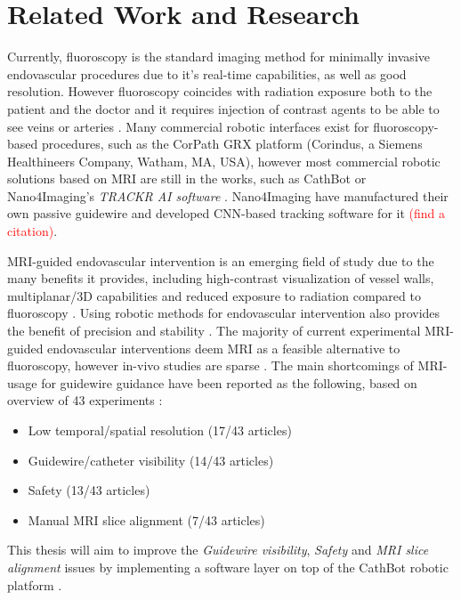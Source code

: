 \documentclass{article}
\begin{document}
\section{Related Work and Research}
Currently, fluoroscopy is the standard imaging method for minimally invasive endovascular procedures due to it's real-time capabilities, as well as good resolution. However fluoroscopy coincides with radiation exposure both to the patient and the doctor and it requires injection of contrast agents to be able to see veins or arteries \cite{pmid35420239}. Many commercial robotic interfaces exist for fluoroscopy-based procedures, such as the CorPath GRX platform (Corindus, a Siemens Healthineers Company, Watham, MA, USA), however most commercial robotic solutions based on MRI are still in the works, such as CathBot \cite{cathbot} or Nano4Imaging's \textit{TRACKR AI software} \cite{nano4imaging}. Nano4Imaging have manufactured their own passive guidewire and developed CNN-based tracking software for it \textcolor{red}{(find a citation)}.

MRI-guided endovascular intervention is an emerging field of study due to the many benefits it provides, including high-contrast visualization of vessel walls, multiplanar/3D capabilities and reduced exposure to radiation compared to fluoroscopy \cite{active-vs-passive-tracking}. Using robotic methods for endovascular intervention also provides the benefit of precision and stability \cite{pmid24663088}. The majority of current experimental MRI-guided endovascular interventions deem MRI as a feasible alternative to fluoroscopy, however in-vivo studies are sparse \cite{pmid35420239}. The main shortcomings of MRI-usage for guidewire guidance have been reported as the following, based on overview of 43 experiments \cite{pmid35420239}:

\begin{itemize}
    \item Low temporal/spatial resolution (17/43 articles)
    \item Guidewire/catheter visibility (14/43 articles)
    \item Safety (13/43 articles)
    \item Manual MRI slice alignment (7/43 articles) 
\end{itemize}

This thesis will aim to improve the \textit{Guidewire visibility}, \textit{Safety} and \textit{MRI slice alignment} issues by implementing a software layer on top of the CathBot robotic platform \cite{cathbot}.\\
\end{document}
